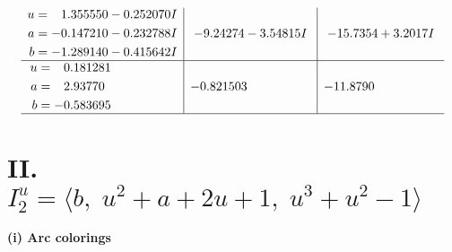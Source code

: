 \documentclass[1p]{elsarticle_modified}
\theoremstyle{definition}
\begin{document}
$$\begin{array}{c|c|c}
\begin{aligned}
u &= \phantom{-}1.355550 - 0.252070 I \\
a &= -0.147210 - 0.232788 I \\
b &= -1.289140 - 0.415642 I\end{aligned}
 & -9.24274 - 3.54815 I & -15.7354 + 3.2017 I \\ \hline\begin{aligned}
u &= \phantom{-}0.181281\phantom{ +0.000000I} \\
a &= \phantom{-}2.93770\phantom{ +0.000000I} \\
b &= -0.583695\phantom{ +0.000000I}\end{aligned}
 & -0.821503\phantom{ +0.000000I} & -11.8790\phantom{ +0.000000I}\\
 \hline 
 \end{array}$$\newpage\newpage\renewcommand{\arraystretch}{1}
\centering \section*{II. $I^u_{2}= \langle b,\;u^2+a+2 u+1,\;u^3+u^2-1 \rangle$}
\flushleft \textbf{(i) Arc colorings}\\
\end{document}
